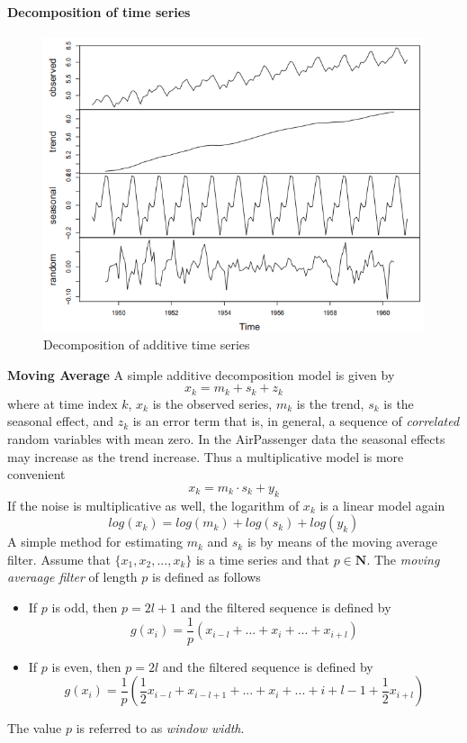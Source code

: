 {{\paragraph{Decomposition of time series}
\begin{figure}[H]\centering
	\includegraphics[width=0.7\linewidth]{images/tsDecomposition.png}
	\caption{Decomposition of additive time series}
	\label{Fig:tsDecomposition}
\end{figure}
\RTheory
{\textbf{Moving Average}\vfill
A simple additive decomposition model is given by
$$x_k = m_k + s_k + z_k $$
where at time index $k$, $x_k$ is the observed series, $m_k$ is the trend,  $s_k$ is the seasonal effect, and $z_k$ is an error term that is, in general, a sequence of \textit{correlated} random variables with mean zero.
\vfill
\hfill
\break
In the AirPassenger data the seasonal effects may increase as the trend increase. Thus a multiplicative model is more convenient
$$ x_k = m_k \cdot s_k + y_k $$
If the noise is multiplicative as well, the logarithm of $x_k$ is a linear model again
$$log(x_k) = log(m_k) + log(s_k) + log(y_k) $$
A simple method for estimating $m_k$ and $s_k$ is by means of the moving average filter. Assume that $\{x_1,x_2,...,x_k \}$ is a time series and that $p \in \mathbf{N}$. The \textit{moving averaage filter} of length $p$ is defined as follows
\begin{itemize}
	\item  If $p$ is odd, then $p=2l + 1$ and the filtered sequence is defined by
	$$ g(x_i)= \frac{1}{p}(x_{i-l}+...+x_i+...+x_{i+l})$$ 
	\item  If $p$ is even, then $p=2l$ and the filtered sequence is defined by
	$$ g(x_i)= \frac{1}{p}(\frac{1}{2}x_{i-l}+x_{i-l+1}+...+x_i+...+{i+l-1}+\frac{1}{2}x_{i+l})$$ 
\end{itemize}
The value $p$ is referred to as \textit{window width}. 
}}}
